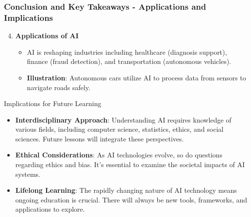 \documentclass[aspectratio=169]{beamer}
\begin{document}
\begin{frame}[fragile]
    \frametitle{Conclusion and Key Takeaways - Applications and Implications}
    \begin{enumerate}
        \setcounter{enumi}{3} %
        \item \textbf{Applications of AI}
            \begin{itemize}
                \item AI is reshaping industries including healthcare (diagnosis support), finance (fraud detection), and transportation (autonomous vehicles).
                \item \textbf{Illustration}: Autonomous cars utilize AI to process data from sensors to navigate roads safely.
            \end{itemize}
    \end{enumerate}
    
    \begin{block}{Implications for Future Learning}
        \begin{itemize}
            \item \textbf{Interdisciplinary Approach}: Understanding AI requires knowledge of various fields, including computer science, statistics, ethics, and social sciences. Future lessons will integrate these perspectives.
            \item \textbf{Ethical Considerations}: As AI technologies evolve, so do questions regarding ethics and bias. It's essential to examine the societal impacts of AI systems.
            \item \textbf{Lifelong Learning}: The rapidly changing nature of AI technology means ongoing education is crucial. There will always be new tools, frameworks, and applications to explore.
        \end{itemize}
    \end{block}
\end{frame}
\end{document}
